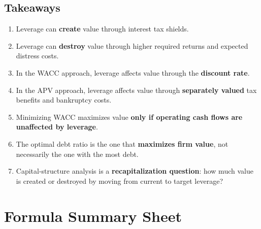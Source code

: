 \subsection{Takeaways}
\begin{enumerate}
  \item Leverage can \textbf{create} value through interest tax shields.
  \item Leverage can \textbf{destroy} value through higher required returns and expected distress costs.
  \item In the WACC approach, leverage affects value through the \textbf{discount rate}.
  \item In the APV approach, leverage affects value through \textbf{separately valued} tax benefits and bankruptcy costs.
  \item Minimizing WACC maximizes value \textbf{only if operating cash flows are unaffected by leverage}.
  \item The optimal debt ratio is the one that \textbf{maximizes firm value}, not necessarily the one with the most debt.
  \item Capital-structure analysis is a \textbf{recapitalization question}: how much value is created or destroyed by moving from current to target leverage?
\end{enumerate}

\section{Formula Summary Sheet}


